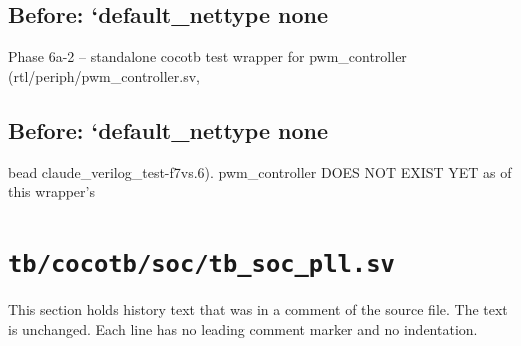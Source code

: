 \begin{record}

\subsection*{Before: `default\_nettype none}

\begin{textblock}
Phase 6a-2 -- standalone cocotb test wrapper for pwm_controller (rtl/periph/pwm_controller.sv,
\end{textblock}

\subsection*{Before: `default\_nettype none}

\begin{textblock}
bead claude_verilog_test-f7vs.6). pwm_controller DOES NOT EXIST YET as of this wrapper's
\end{textblock}

\end{record}

\section{\texttt{tb/cocotb/soc/tb\_soc\_pll.sv}}\label{cr:suite:soc-tb-soc-pll-sv}

This section holds history text that was in a comment of the source file. The text is unchanged. Each line has no leading comment marker and no indentation.

